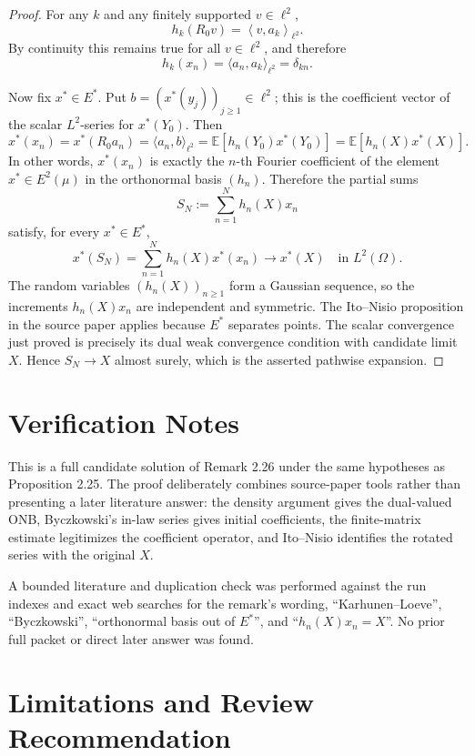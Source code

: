 \documentclass[11pt]{article}
\newcommand{\EE}{\mathbb E}
\begin{document}
\begin{proof}
For any \(k\) and any finitely supported \(v\in\ell^2\),
\[
  h_k(R_0v)
  =
  \left\langle v,a_k\right\rangle_{\ell^2}.
\]
By continuity this remains true for all \(v\in\ell^2\), and therefore
\[
  h_k(x_n)=\langle a_n,a_k\rangle_{\ell^2}=\delta_{kn}.
\]

Now fix \(x^*\in E^*\). Put \(b=(x^*(y_j))_{j\ge 1}\in\ell^2\); this is the
coefficient vector of the scalar \(L^2\)-series for \(x^*(Y_0)\). Then
\[
  x^*(x_n)
  =
  x^*(R_0a_n)
  =
  \langle a_n,b\rangle_{\ell^2}
  =
  \EE[h_n(Y_0)x^*(Y_0)]
  =
  \EE[h_n(X)x^*(X)].
\]
In other words, \(x^*(x_n)\) is exactly the \(n\)-th Fourier coefficient of
the element \(x^*\in E^2(\mu)\) in the orthonormal basis \((h_n)\). Therefore
the partial sums
\[
  S_N:=\sum_{n=1}^N h_n(X)x_n
\]
satisfy, for every \(x^*\in E^*\),
\[
  x^*(S_N)
  =
  \sum_{n=1}^N h_n(X)x^*(x_n)
  \longrightarrow
  x^*(X)
  \quad\text{in }L^2(\Omega).
\]
The random variables \((h_n(X))_{n\ge 1}\) form a Gaussian sequence, so the
increments \(h_n(X)x_n\) are independent and symmetric. The Ito--Nisio
proposition in the source paper applies because \(E^*\) separates points.
The scalar convergence just proved is precisely its dual weak convergence
condition with candidate limit \(X\). Hence \(S_N\to X\) almost surely, which
is the asserted pathwise expansion.
\end{proof}

\section*{Verification Notes}

This is a full candidate solution of Remark 2.26 under the same hypotheses as
Proposition 2.25. The proof deliberately combines source-paper tools rather
than presenting a later literature answer: the density argument gives the
dual-valued ONB, Byczkowski's in-law series gives initial coefficients, the
finite-matrix estimate legitimizes the coefficient operator, and Ito--Nisio
identifies the rotated series with the original \(X\).

A bounded literature and duplication check was performed against the run
indexes and exact web searches for the remark's wording, ``Karhunen--Loeve'',
``Byczkowski'', ``orthonormal basis out of \(E^*\)'', and
``\(h_n(X)x_n=X\)''. No prior full packet or direct later answer was found.

\section*{Limitations and Review Recommendation}
\end{document}
